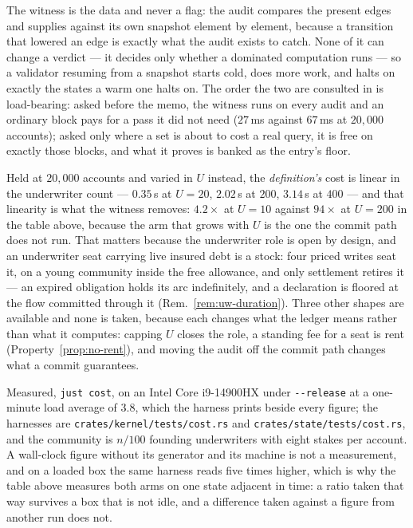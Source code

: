 The witness is the data and never a flag: the audit compares the present edges and
supplies against its own snapshot element by element, because a transition that lowered an
edge is exactly what the audit exists to catch. None of it can change a verdict --- it
decides only whether a dominated computation runs --- so a validator resuming from a
snapshot starts cold, does more work, and halts on exactly the states a warm one halts on.
The order the two are consulted in is load-bearing: asked before the memo, the witness
runs on every audit and an ordinary block pays for a pass it did not need ($27$\,ms
against $67$\,ms at $20{,}000$ accounts); asked only where a set is about to cost a real
query, it is free on exactly those blocks, and what it proves is banked as the entry's
floor.

Held at $20{,}000$ accounts and varied in $U$ instead, the \emph{definition's} cost is
linear in the underwriter count --- $0.35$\,s at $U = 20$, $2.02$\,s at $200$, $3.14$\,s
at $400$ --- and that linearity is what the witness removes: $4.2\times$ at $U = 10$
against $94\times$ at $U = 200$ in the table above, because the arm that grows with $U$ is
the one the commit path does not run. That matters because the underwriter role is open by
design, and an underwriter seat carrying live insured debt is a stock: four priced writes
seat it, on a young community inside the free allowance, and only settlement retires it
--- an expired obligation holds its arc indefinitely, and a declaration is floored at the
flow committed through it (Rem.~\ref{rem:uw-duration}). Three other shapes are available
and none is taken, because each changes what the ledger means rather than what it
computes: capping $U$ closes the role, a standing fee for a seat is rent
(Property~\ref{prop:no-rent}), and moving the audit off the commit path changes what a
commit guarantees.

Measured, \texttt{just cost}, on an Intel Core i9-14900HX under
\texttt{-{}-release} at a one-minute load average of $3.8$, which the harness prints
beside every figure; the harnesses are \texttt{crates/kernel/tests/cost.rs} and
\texttt{crates/state/tests/cost.rs}, and the community is $n/100$ founding underwriters
with eight stakes per account. A wall-clock figure without its generator and its machine
is not a measurement, and on a loaded box the same harness reads five times higher, which
is why the table above measures both arms on one state adjacent in time: a ratio taken
that way survives a box that is not idle, and a difference taken against a figure from
another run does not.

